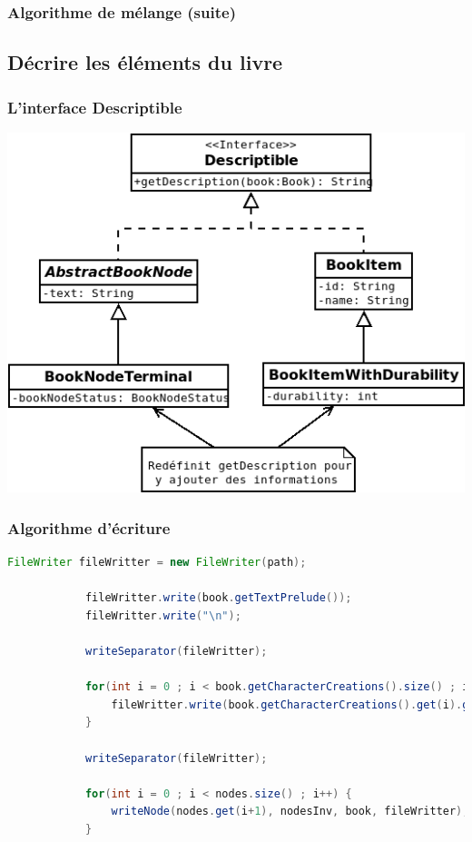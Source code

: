 \documentclass[beamer]{BetterDocument}
\begin{document}
	\begin{frame}
		\frametitle{Algorithme de mélange (suite)}

		\begin{algorithm}[H]
			\scriptsize
			\DontPrintSemicolon


			\;
		\end{algorithm}
	\end{frame}

	\subsection{Décrire les éléments du livre}
	\begin{frame}
		\frametitle{L'interface \textbf{Descriptible}}

		\center\includegraphics[height=0.7\paperheight, keepaspectratio]{img/descriptible.png}
	\end{frame}

	\begin{frame}[fragile]
		\frametitle{Algorithme d'écriture}

		\begin{lstlisting}[gobble=12, language=java,
    basicstyle=\ttfamily\fontsize{7}{9}\selectfont]
			FileWriter fileWritter = new FileWriter(path);

			fileWritter.write(book.getTextPrelude());
			fileWritter.write("\n");

			writeSeparator(fileWritter);

			for(int i = 0 ; i < book.getCharacterCreations().size() ; i++) {
				fileWritter.write(book.getCharacterCreations().get(i).getDescription(book));
			}

			writeSeparator(fileWritter);

			for(int i = 0 ; i < nodes.size() ; i++) {
				writeNode(nodes.get(i+1), nodesInv, book, fileWritter);
			}
		\end{lstlisting}
	\end{frame}
\end{document}
